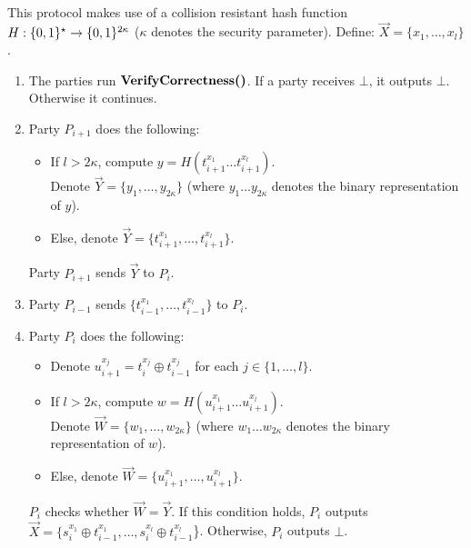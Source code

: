 \begin{protocol}
     \\
    This protocol makes use of a collision resistant hash function $H: \{0, 1\}^{\star} \rightarrow \{0, 1\}^{2 \kappa}$ ($\kappa$ denotes the security parameter).
    Define: $\vec{X} = \{x_1, \ldots, x_l\}$.
    \begin{enumerate}
        \item The parties run $\textbf{VerifyCorrectness()}$.
        If a party receives $\bot$, it outputs $\bot$. Otherwise it continues.
        \item Party $P_{i + 1}$ does the following:
        \begin{itemize}
            \item If $l > 2 \kappa$, compute $y = H(t^{x_1}_{i + 1} \ldots t^{x_l}_{i + 1})$. \\
            Denote $\vec{Y} = \{y_1, \ldots, y_{2\kappa}\}$ (where $y_1 \ldots y_{2\kappa}$ denotes the binary representation of $y$).
            \item Else, denote $\vec{Y} = \{t^{x_1}_{i + 1}, \ldots, t^{x_l}_{i + 1}\}$.
        \end{itemize}
        Party $P_{i + 1}$ sends $\vec{Y}$ to $P_i$.
        \item Party $P_{i - 1}$ sends $\{t^{x_1}_{i - 1}, \ldots, t^{x_l}_{i - 1}\}$ to $P_i$.
        \item Party $P_i$ does the following:
        \begin{itemize}
            \item Denote $u_{i + 1}^{x_j} = t^{x_j}_i \oplus t^{x_j}_{i - 1}$ for each $j \in \{1, \ldots , l\}$.
            \item If $l > 2 \kappa$, compute $w = H(u_{i + 1}^{x_1} \ldots u_{i + 1}^{x_l})$. \\
            Denote $\vec{W} = \{w_1, \ldots, w_{2\kappa}\}$ (where $w_1 \ldots w_{2\kappa}$ denotes the binary representation of $w$).
            \item Else, denote $\vec{W} = \{u_{i + 1}^{x_1}, \ldots, u_{i + 1}^{x_l}\}$.
        \end{itemize}
        $P_i$ checks whether $\vec{W} = \vec{Y}$.
        If this condition holds, $P_i$ outputs $\vec{X} = \{s^{x_1}_i \oplus t^{x_1}_{i - 1}, \ldots, s^{x_l}_i \oplus t^{x_l}_{i - 1}$\}.
        Otherwise, $P_i$ outputs $\bot$.
    \end{enumerate}
\end{protocol}

